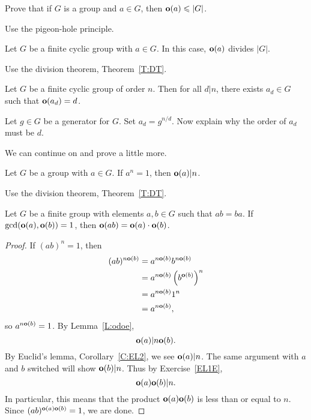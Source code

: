 \documentclass{ximera}
\begin{document}
\begin{lemma}
  Prove that if $G$ is a group and $a\in G$, then $\mathbf o(a)\leqslant |G|$.
  \begin{sketch}
    Use the pigeon-hole principle.
  \end{sketch}
\end{lemma}


\begin{theorem}\label{T:eodvgo}
  Let $G$ be a finite cyclic group with $a\in G$. In this case,
  $\mathbf o(a)$ divides $|G|$.
  \begin{sketch}
    Use the division theorem, Theorem~\ref{T:DT}.
  \end{sketch}
\end{theorem}

\begin{corollary}
  Let $G$ be a finite cyclic group of order $n$. Then for all $d|n$,
  there exists $a_d\in G$ such that $\mathbf o(a_d) = d$.
  \begin{sketch}
    Let $g\in G$ be a generator for $G$. Set $a_d = g^{n/d}$. Now
    explain why the order of $a_d$ must be $d$.
  \end{sketch}
\end{corollary}

We can continue on and prove a little more.



\begin{lemma}\label{L:odoe}
  Let $G$ be a group with $a\in G$. If $a^n = 1$, then $\mathbf o(a)|n$.
  \begin{sketch}
    Use the division theorem, Theorem~\ref{T:DT}.
  \end{sketch}
\end{lemma}


\begin{lemma}\label{L:cpeo}
  Let $G$ be a finite group with elements $a,b\in G$ such that
  $ab=ba$. If $\gcd(\mathbf o(a),\mathbf o(b)) = 1$, then $\mathbf o(ab) = \mathbf o(a)\cdot
  \mathbf o(b)$.
  \begin{proof}
    If $(ab)^n = 1$, then
    \begin{align*}
      (ab)^{n\mathbf o(b)} &= a^{n\mathbf o(b)}b^{n\mathbf o(b)}\\
      &=a^{n\mathbf o(b)}\left(b^{\mathbf o(b)}\right)^n \\
      &=a^{n\mathbf o(b)}1^n \\
      &=a^{n\mathbf o(b)},
    \end{align*}
    so $a^{n\mathbf o(b)} = 1$. By Lemma~\ref{L:odoe},
    \[
    \mathbf o(a) | n\mathbf o(b).
    \]
    By Euclid's lemma, Corollary~\ref{C:EL2}, we see $\mathbf o(a) | n$. The
    same argument with $a$ and $b$ switched will show $\mathbf o(b)|n$. Thus
    by Exercise~\ref{EL1E},
    \[
    \mathbf o(a)\mathbf o(b)|n.
    \]
    In particular, this means that the product $\mathbf o(a)\mathbf o(b)$ is less
    than or equal to $n$.  Since $(ab)^{\mathbf o(a)\mathbf o(b)} = 1$, we are done.
  \end{proof}
\end{lemma}
\end{document}
